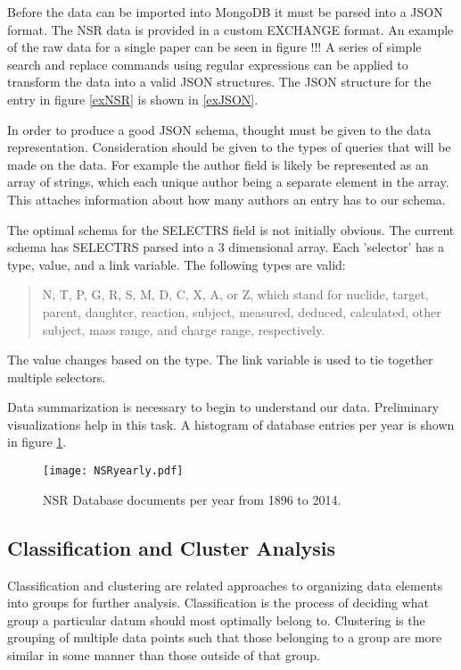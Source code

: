\documentclass[12pt]{article}
\begin{document}
\begin{doublespacing}
Before the data can be imported into MongoDB it must be parsed into a JSON format.
The NSR data is provided in a custom EXCHANGE format. \citep{NSRhandbook}
An example of the raw data for a single paper can be seen in figure !!! %
A series of simple search and replace commands using regular expressions can be applied to transform the data into a valid JSON structures.
The JSON structure for the entry in figure \ref{exNSR} is shown in \ref{exJSON}. %

In order to produce a good JSON schema, thought must be given to the data representation.
Consideration should be given to the types of queries that will be made on the data.
For example the author field is likely be represented as an array of strings, which each unique author being a separate element in the array.
This attaches information about how many authors an entry has to our schema.

The optimal schema for the SELECTRS field is not initially obvious.
The current schema has SELECTRS parsed into a 3 dimensional array.
Each 'selector' has a type, value, and a link variable.
The following types are valid:
\begin{quote}
N, T, P, G, R, S, M, D, C, X, A, or Z, which stand for nuclide, target, parent, daughter, reaction, subject, measured, deduced, calculated, other subject, mass range, and charge range, respectively.
\end{quote}
The value changes based on the type. The link variable is used to tie together multiple selectors.

Data summarization is necessary to begin to understand our data.
Preliminary visualizations help in this task.
A histogram of database entries per year is shown in figure \ref{fig:NSRyearly}.

\begin{figure}[!hb]
    \label{fig:NSRyearly}
    \centering
    \texttt{[image: NSRyearly.pdf]}
    \caption{NSR Database documents per year from 1896 to 2014.}
\end{figure}

\subsection{Classification and Cluster Analysis}
Classification and clustering are related approaches to organizing data elements into groups for further analysis.
Classification is the process of deciding what group a particular datum should most optimally belong to.
Clustering is the grouping of multiple data points such that those belonging to a group are more similar in some manner than those outside of that group.


\end{doublespacing}
\end{document}
